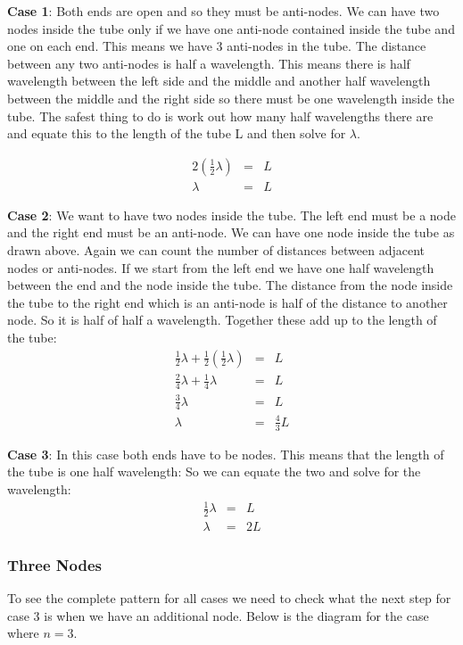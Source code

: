 \textbf{Case 1}:
Both ends are open and so they must be anti-nodes. We can have two
nodes inside the tube only if we have one anti-node contained inside
the tube and one on each end. This means we have 3 anti-nodes in the
tube. The distance between any two anti-nodes is half a
wavelength. This means there is half wavelength between the left side
and the middle and another half wavelength between the middle and the
right side so there must be one wavelength inside the tube. The safest
thing to do is work out how many half wavelengths there are and equate
this to the length of the tube L and then solve for $\lambda$.

\begin{eqnarray*}
2(\frac{1}{2}\lambda) & = & L \\
\lambda & = & L
\end{eqnarray*}

\textbf{Case 2}:
We want to have two nodes inside the tube. The left end must be a
node and the right end must be an anti-node. We can have one node
inside the tube as drawn above. Again we can count the number of
distances between adjacent nodes or anti-nodes. If we start from the
left end we have one half wavelength between the end and the node
inside the tube. The distance from the node inside the tube to the
right end which is an anti-node is half of the distance to another
node. So it is half of half a wavelength. Together these add up to the
length of the tube:
\begin{eqnarray*}
\frac{1}{2}\lambda + \frac{1}{2}(\frac{1}{2}\lambda) &=& L\\
\frac{2}{4}\lambda + \frac{1}{4}\lambda &=& L\\
\frac{3}{4}\lambda &=& L\\
\lambda &=& \frac{4}{3}L
\end{eqnarray*}

\textbf{Case 3}:
In this case both ends have to be nodes. This means that the length of
the tube is one half wavelength:
So we can equate the two and solve for the wavelength:
\begin{eqnarray*}
\frac{1}{2}\lambda & =& L \\
\lambda &=& 2L
\end{eqnarray*}



\subsubsection{Three Nodes}
To see the complete pattern for all cases we need to check what the next step
for case 3 is when we have an additional node. Below is the diagram for the case
where $n = 3$.

